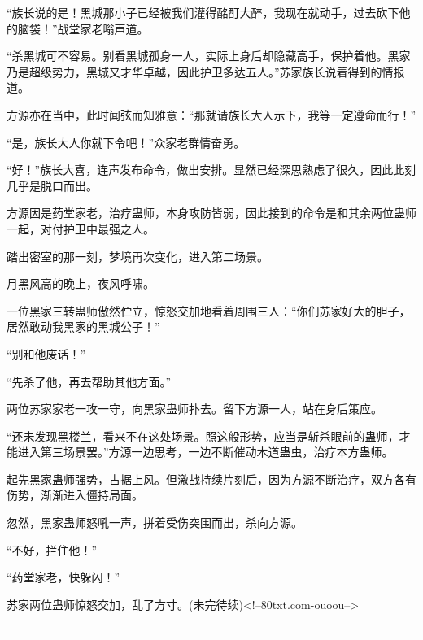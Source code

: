 \begin{this_body}
“族长说的是！黑城那小子已经被我们灌得酩酊大醉，我现在就动手，过去砍下他的脑袋！”战堂家老嗡声道。

“杀黑城可不容易。别看黑城孤身一人，实际上身后却隐藏高手，保护着他。黑家乃是超级势力，黑城又才华卓越，因此护卫多达五人。”苏家族长说着得到的情报道。

方源亦在当中，此时闻弦而知雅意：“那就请族长大人示下，我等一定遵命而行！”

“是，族长大人你就下令吧！”众家老群情奋勇。

“好！”族长大喜，连声发布命令，做出安排。显然已经深思熟虑了很久，因此此刻几乎是脱口而出。

方源因是药堂家老，治疗蛊师，本身攻防皆弱，因此接到的命令是和其余两位蛊师一起，对付护卫中最强之人。

踏出密室的那一刻，梦境再次变化，进入第二场景。

月黑风高的晚上，夜风呼啸。

一位黑家三转蛊师傲然伫立，惊怒交加地看着周围三人：“你们苏家好大的胆子，居然敢动我黑家的黑城公子！”

“别和他废话！”

“先杀了他，再去帮助其他方面。”

两位苏家家老一攻一守，向黑家蛊师扑去。留下方源一人，站在身后策应。

“还未发现黑楼兰，看来不在这处场景。照这般形势，应当是斩杀眼前的蛊师，才能进入第三场景罢。”方源一边思考，一边不断催动木道蛊虫，治疗本方蛊师。

起先黑家蛊师强势，占据上风。但激战持续片刻后，因为方源不断治疗，双方各有伤势，渐渐进入僵持局面。

忽然，黑家蛊师怒吼一声，拼着受伤突围而出，杀向方源。

“不好，拦住他！”

“药堂家老，快躲闪！”

苏家两位蛊师惊怒交加，乱了方寸。(未完待续)<!--80txt.com-ouoou-->

------------

\end{this_body}

